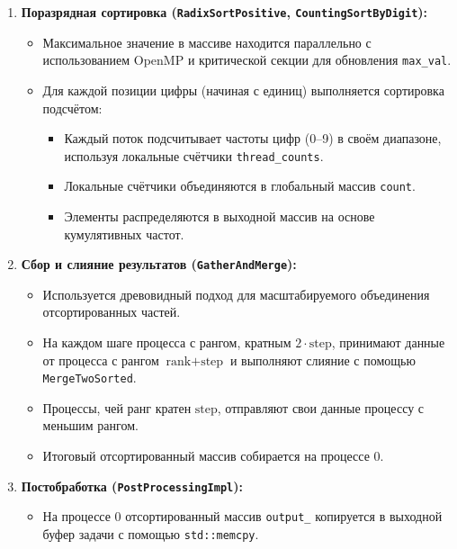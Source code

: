 \documentclass[12pt]{article}
\begin{document}
\begin{enumerate}
  \item \textbf{Поразрядная сортировка (\texttt{RadixSortPositive}, \texttt{CountingSortByDigit}):}
  \begin{itemize}
    \item Максимальное значение в массиве находится параллельно с использованием OpenMP и критической секции для обновления \texttt{max\_val}.
    \item Для каждой позиции цифры (начиная с единиц) выполняется сортировка подсчётом:
    \begin{itemize}
      \item Каждый поток подсчитывает частоты цифр (0--9) в своём диапазоне, используя локальные счётчики \texttt{thread\_counts}.
      \item Локальные счётчики объединяются в глобальный массив \texttt{count}.
      \item Элементы распределяются в выходной массив на основе кумулятивных частот.
    \end{itemize}
  \end{itemize}

  \item \textbf{Сбор и слияние результатов (\texttt{GatherAndMerge}):}
  \begin{itemize}
    \item Используется древовидный подход для масштабируемого объединения отсортированных частей.
    \item На каждом шаге процесса с рангом, кратным $2 \cdot \text{step}$, принимают данные от процесса с рангом $\text{rank} + \text{step}$ и выполняют слияние с помощью \texttt{MergeTwoSorted}.
    \item Процессы, чей ранг кратен $\text{step}$, отправляют свои данные процессу с меньшим рангом.
    \item Итоговый отсортированный массив собирается на процессе 0.
  \end{itemize}

  \item \textbf{Постобработка (\texttt{PostProcessingImpl}):}
  \begin{itemize}
    \item На процессе 0 отсортированный массив \texttt{output\_} копируется в выходной буфер задачи с помощью \texttt{std::memcpy}.
  \end{itemize}
\end{enumerate}
\end{document}
